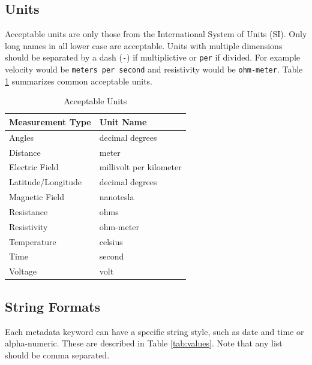 \documentclass[12pt]{article}
\begin{document}
\subsection{Units}
Acceptable units are only those from the International System of Units (SI).  Only long names in all lower case are acceptable.  Units with multiple dimensions should be separated by a dash (\verb|-|) if multiplictive or \verb|per| if divided.  For example velocity would be \verb|meters per second| and resistivity would be \verb|ohm-meter|.  Table \ref{tab:units} summarizes common acceptable units.


\begin{table}[!h]
	\centering
	\caption[Acceptable Units]{Acceptable Units}
	\begin{tabular}{ll}
		\toprule
		\textbf{Measurement Type} & \textbf{Unit Name} \\ \midrule
		Angles & decimal degrees \\ \midrule
		Distance &  meter  \\ \midrule
		Electric Field & millivolt per kilometer\\ \midrule
		Latitude/Longitude & decimal degrees \\ \midrule
		Magnetic Field & nanotesla \\ \midrule
		Resistance & ohms   \\ \midrule
		Resistivity & ohm-meter \\ \midrule
		Temperature & celsius\\ \midrule
		Time & second\\ \midrule
		Voltage & volt \\ \bottomrule
		
		
	\end{tabular}
	\label{tab:units}
\end{table}

\subsection{String Formats}

Each metadata keyword can have a specific string style, such as date and time or alpha-numeric.  These are described in Table \ref{tab:values}.  Note that any list should be comma separated.
\end{document}
